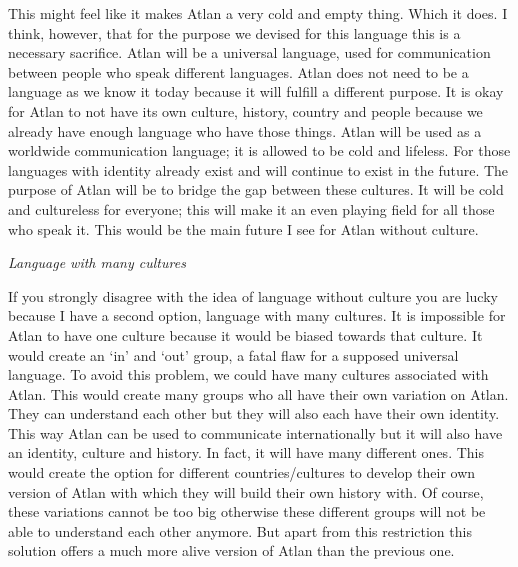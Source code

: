 This might feel like it makes Atlan a very cold and empty thing. Which it does. I think, however, that for the purpose we devised for this language this is a necessary sacrifice. Atlan will be a universal language, used for communication between people who speak different languages. Atlan does not need to be a language as we know it today because it will fulfill a different purpose. It is okay for Atlan to not have its own culture, history, country and people because we already have enough language who have those things. Atlan will be used as a worldwide communication language; it is allowed to be cold and lifeless. For those languages with identity already exist and will continue to exist in the future. The purpose of Atlan will be to bridge the gap between these cultures. It will be cold and cultureless for everyone; this will make it an even playing field for all those who speak it. This would be the main future I see for Atlan without culture.  

\textit{Language with many cultures} 

If you strongly disagree with the idea of language without culture you are lucky because I have a second option, language with many cultures. It is impossible for Atlan to have one culture because it would be biased towards that culture. It would create an ‘in’ and ‘out’ group, a fatal flaw for a supposed universal language. To avoid this problem, we could have many cultures associated with Atlan. This would create many groups who all have their own variation on Atlan. They can understand each other but they will also each have their own identity. This way Atlan can be used to communicate internationally but it will also have an identity, culture and history. In fact, it will have many different ones. This would create the option for different countries/cultures to develop their own version of Atlan with which they will build their own history with. Of course, these variations cannot be too big otherwise these different groups will not be able to understand each other anymore. But apart from this restriction this solution offers a much more alive version of Atlan than the previous one.  

